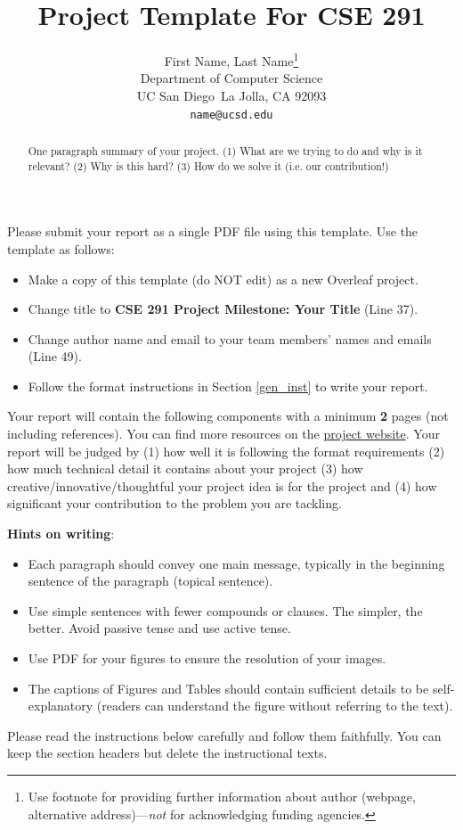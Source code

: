 \documentclass{article}
\title{Project Template For CSE 291}
\author{%
  First Name, Last Name\thanks{Use footnote for providing further information
    about author (webpage, alternative address)---\emph{not} for acknowledging
    funding agencies.} \\
  Department of Computer Science\\
  UC San Diego\
  La Jolla, CA 92093 \\
  \texttt{name@ucsd.edu} \\
}
\newcommand{\new}[1]{{\color{red} #1}}
\begin{document}
\maketitle


\begin{abstract}
  One paragraph summary of your project. (1) What are we trying to do and why is it relevant?
(2) Why is this hard?  (3) How do we solve it (i.e. our contribution!)
\end{abstract}
\noindent Please submit your report as a single PDF file using this template. Use the template as follows:
\begin{itemize}
    \item Make a copy of this template (do NOT edit) as a new Overleaf project.
    \item Change title to \new{\textbf{CSE 291  Project Milestone: Your Title} (Line 37)}.
    \item Change author name and email to your  team members' names and emails (Line 49).
    \item Follow the format instructions in Section \ref{gen_inst} to write your report.
\end{itemize}
Your report will contain the following components with a minimum \textbf{2} pages (not including references). You can find more resources on the \href{https://sites.google.com/view/cse-291-drl/project?authuser=0}{project website}. Your report will be judged by (1) how well it is following the format requirements  (2) how much technical detail it contains about  your  project (3) how creative/innovative/thoughtful  your  project idea is for the project and (4) how significant your contribution to the problem you are tackling. 

\textbf{Hints on writing}:
\begin{itemize}
    \item Each paragraph should convey one main message, typically in the beginning sentence of the paragraph (topical sentence).
    \item  Use simple sentences with fewer compounds or clauses. The simpler, the better. Avoid passive tense and use active tense.
    \item Use PDF for your figures to ensure the resolution of your images.
    \item The captions of Figures and Tables should contain sufficient details to be self-explanatory (readers can understand the figure without referring to the text).
\end{itemize}
Please read the instructions below carefully and follow them faithfully. You can keep the section headers but delete the instructional texts.
\end{document}
